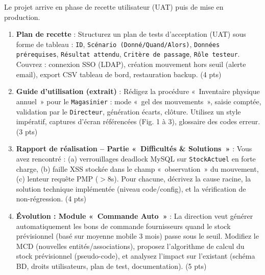 \documentclass[11pt]{article}
\begin{document}
\begin{exercice}
Le projet arrive en phase de recette utilisateur (UAT) puis de mise en production.

\begin{enumerate}
    \item \textbf{Plan de recette} : Structurez un plan de tests d'acceptation (UAT) sous forme de tableau : \texttt{ID}, \texttt{Scénario (Donné/Quand/Alors)}, \texttt{Données prérequises}, \texttt{Résultat attendu}, \texttt{Critère de passage}, \texttt{Rôle testeur}. Couvrez : connexion SSO (LDAP), création mouvement hors seuil (alerte email), export CSV tableau de bord, restauration backup. (4 pts)
    \item \textbf{Guide d'utilisation (extrait)} : Rédigez la procédure «~Inventaire physique annuel~» pour le \texttt{Magasinier} : mode «~gel des mouvements~», saisie comptée, validation par le \texttt{Directeur}, génération écarts, clôture. Utilisez un style impératif, captures d'écran référencées (Fig. 1 à 3), glossaire des codes erreur. (3 pts)
    \item \textbf{Rapport de réalisation -- Partie «~Difficultés \& Solutions~»} : Vous avez rencontré : (a) verrouillages deadlock MySQL sur \texttt{StockActuel} en forte charge, (b) faille XSS stockée dans le champ «~observation~» du mouvement, (c) lenteur requête PMP ($>8$s). Pour chacune, décrivez la cause racine, la solution technique implémentée (niveau code/config), et la vérification de non-régression. (4 pts)
    \item \textbf{Évolution : Module «~Commande Auto~»} : La direction veut générer automatiquement les bons de commande fournisseurs quand le stock prévisionnel (basé sur moyenne mobile 3 mois) passe sous le seuil. Modifiez le MCD (nouvelles entités/associations), proposez l'algorithme de calcul du stock prévisionnel (pseudo-code), et analysez l'impact sur l'existant (schéma BD, droits utilisateurs, plan de test, documentation). (5 pts)
\end{enumerate}
\end{exercice}
\end{document}
